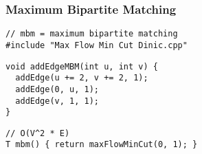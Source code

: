 \documentclass[twoside]{article}
\newcommand{\fileTitleStyle}{\large\underline}
\begin{document}
\begin{multicols*}{2}
\subsubsectionfont{\centering\bfseries\Large}
\subsubsectionfont{\fileTitleStyle}
\subsubsection*{Maximum Bipartite Matching}
\begin{verbatim}
// mbm = maximum bipartite matching
#include "Max Flow Min Cut Dinic.cpp"
\end{verbatim}
\vspace{-12pt}
\begin{verbatim}
void addEdgeMBM(int u, int v) {
  addEdge(u += 2, v += 2, 1);
  addEdge(0, u, 1);
  addEdge(v, 1, 1);
}
\end{verbatim}
\vspace{-12pt}
\begin{verbatim}
// O(V^2 * E)
T mbm() { return maxFlowMinCut(0, 1); }
\end{verbatim}

\subsubsectionfont{\centering\bfseries\Large}
\subsubsectionfont{\fileTitleStyle}

\end{multicols*}
\end{document}
